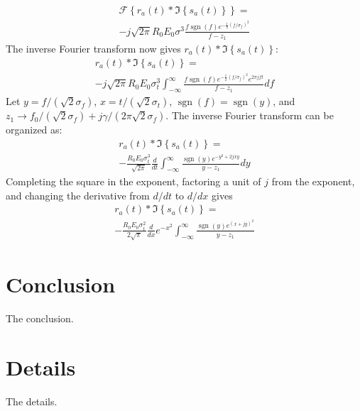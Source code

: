 \documentclass[amsmath,amssymb,aps,prd,10pt,twocolumn,showkeys]{revtex4}
\DeclareMathOperator{\sgn}{sgn}
\begin{document}
\begin{itemize}
\begin{multline}
\mathcal{F}\left\lbrace r_a(t) * \Im\left\lbrace s_a(t)\right\rbrace \right\rbrace = \\ -j \sqrt{2\pi} R_0 E_0 \sigma^3 \frac{f\sgn(f) e^{-\frac{1}{2}(f/\sigma_f)^2}}{f-z_1}
\end{multline}
The inverse Fourier transform now gives $r_a(t) * \Im\left\lbrace s_a(t) \right\rbrace$:
\begin{multline}
r_a(t) * \Im\left\lbrace s_a(t) \right\rbrace = \\
-j\sqrt{2\pi} R_0 E_0 \sigma_t^3 \int_{-\infty}^{\infty} \frac{f\sgn(f)e^{-\frac{1}{2}(f/\sigma_f)^2}e^{2\pi jft}}{f-z_1} df
\end{multline}
Let $y = f/(\sqrt{2}\sigma_f)$, $x=t/(\sqrt{2}\sigma_t)$, $\sgn(f) = \sgn(y)$, and $z_1 \to f_0/(\sqrt{2}\sigma_f) + j\gamma/(2\pi \sqrt{2} \sigma_f)$.  The inverse Fourier transform can be organized as:
\begin{multline}
r_a(t) * \Im\left\lbrace s_a(t) \right\rbrace = \\
-\frac{R_0E_0\sigma_t^3}{\sqrt{2\pi}}\frac{d}{dt}\int_{-\infty}^{\infty} \frac{\sgn(y) e^{-y^2+2jxy}}{y-z_1} dy
\end{multline}
Completing the square in the exponent, factoring a unit of $j$ from the exponent, and changing the derivative from $d/dt$ to $d/dx$ gives
\begin{multline}
r_a(t) * \Im\left\lbrace s_a(t) \right\rbrace = \\
-\frac{R_0E_0\sigma_t^2}{2\sqrt{\pi}}\frac{d}{dx}e^{-x^2} \int_{-\infty}^{\infty} \frac{\sgn(y) e^{(x+jy)^2}}{y-z_1}
\end{multline}
\end{itemize}

\section{Conclusion}
\label{sec:conc}

The conclusion.

\appendix

\section{Details}
\label{app:a}

The details.


\end{document}
